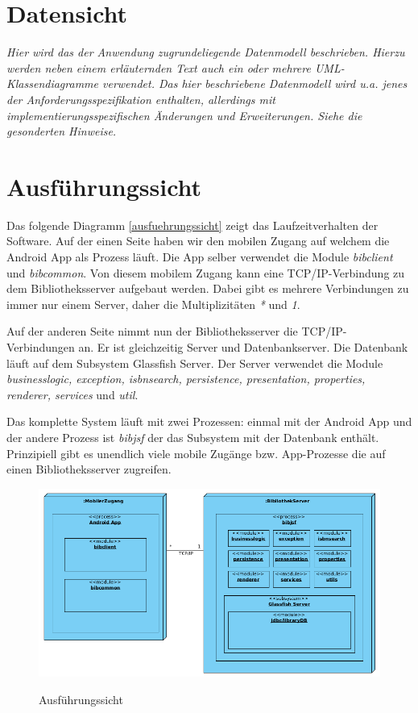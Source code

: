 \documentclass[fontsize=12pt,paper=a4,twoside]{scrartcl}
\newcommand{\highlight}[1]{\textcolor{blue}{\textbf{#1}}}
\newcommand{\nurlangversion}[0]{%
\ifthenelse{\boolean{langversion}}{\highlight{Muss in SWP-2 ausgefüllt werden}}{\highlight{Entfällt in SWP-1}}}
\begin{document}
\section{Datensicht}
\label{sec:datensicht}

{\it Hier wird das der Anwendung zugrundeliegende Datenmodell
  beschrieben. Hierzu werden neben einem erläuternden Text auch ein
  oder mehrere {UML}-Klassendiagramme verwendet. Das hier beschriebene
  Datenmodell wird u.a. jenes der Anforderungsspezifikation enthalten,
  allerdings mit implementierungsspezifischen Änderungen und
  Erweiterungen. Siehe die gesonderten Hinweise.}
  
  

\section{Ausführungssicht}
Das folgende Diagramm \vref{ausfuehrungssicht} zeigt das Laufzeitverhalten der Software.
Auf der einen Seite haben wir den mobilen Zugang auf welchem die Android App als Prozess läuft. Die App selber verwendet die Module \emph{bibclient} und \emph{bibcommon}. Von diesem mobilem Zugang kann eine TCP/IP-Verbindung zu dem Bibliotheksserver aufgebaut werden. Dabei gibt es mehrere Verbindungen zu immer nur einem Server, daher die Multiplizitäten \emph{*} und \emph{1}.

Auf der anderen Seite nimmt nun der Bibliotheksserver die TCP/IP-Verbindungen an. Er ist gleichzeitig Server und Datenbankserver. Die Datenbank läuft auf dem Subsystem Glassfish Server. Der Server verwendet die Module \emph{businesslogic, exception, isbnsearch, persistence, presentation, properties, renderer, services} und \emph{util}.

Das komplette System läuft mit zwei Prozessen: einmal mit der Android App und der andere Prozess ist \emph{bibjsf} der das Subsystem mit der Datenbank enthält. Prinzipiell gibt es unendlich viele mobile Zugänge bzw. App-Prozesse die auf einen Bibliotheksserver zugreifen.

\begin{figure} [H] 
\caption{Ausführungssicht} 
	\includegraphics[width=1\textwidth]{Diagramme/ausfuehrungssicht.png} 
	\label{ausfuehrungssicht} 
\end{figure}
\label{sec:ausfuehrung}
\end{document}
